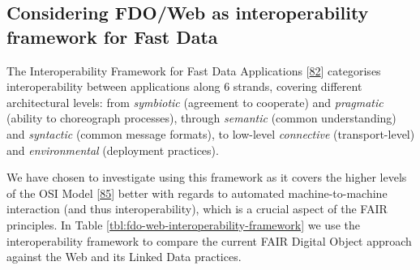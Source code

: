 \hypertarget{sec:interoperability-compare}{%
\subsection{Considering FDO/Web as interoperability framework for Fast Data}\label{sec:interoperability-compare}}

The Interoperability Framework for Fast Data Applications {[}\protect\hyperlink{ref-KlCFFFyL}{82}{]} categorises interoperability between applications along 6 strands, covering different architectural levels: from \emph{symbiotic} (agreement to cooperate) and \emph{pragmatic} (ability to choreograph processes), through \emph{semantic} (common understanding) and \emph{syntactic} (common message formats), to low-level \emph{connective} (transport-level) and \emph{environmental} (deployment practices).

We have chosen to investigate using this framework as it covers the higher levels of the OSI Model {[}\protect\hyperlink{ref-8ZRGFa6y}{85}{]} better with regards to automated machine-to-machine interaction (and thus interoperability), which is a crucial aspect of the FAIR principles. In Table \ref{tbl:fdo-web-interoperability-framework} we use the interoperability framework to compare the current FAIR Digital Object approach against the Web and its Linked Data practices.

